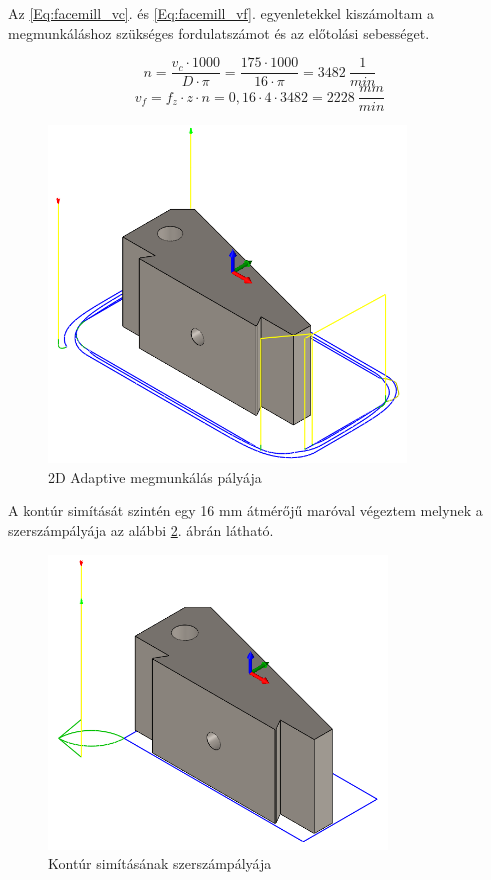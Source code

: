 \documentclass[12pt,a4paper,oneside]{report}
\begin{document}
Az \ref{Eq:facemill_vc}. és \ref{Eq:facemill_vf}. egyenletekkel kiszámoltam a megmunkáláshoz szükséges fordulatszámot és az előtolási sebességet. 

\begin{equation*}
    n=\dfrac{v_c\cdot1000}{D\cdot\pi}=\dfrac{175\cdot1000}{16\cdot\pi}=3482\ \dfrac{1}{min}
\end{equation*}
\begin{equation*}
    v_f=f_z\cdot z\cdot n=0,16\cdot4\cdot3482=2228\ \dfrac{mm}{min}
\end{equation*}

\begin{figure}[H]
    \centering
    \includegraphics[width=9.5cm]{figures/alaptest_adaptive_1.png}
    \caption{2D Adaptive megmunkálás pályája}
    \label{Fig:alaptest_adaptive_1}
\end{figure}

A kontúr simítását szintén egy 16 mm átmérőjű maróval végeztem melynek a szerszámpályája az alábbi \ref{Fig:alaptest_contour_1}. ábrán látható.

\begin{figure}[H]
    \centering
    \includegraphics[width=9cm]{figures/alaptest_contour_1.png}
    \caption{Kontúr simításának szerszámpályája}
    \label{Fig:alaptest_contour_1}
\end{figure}
\end{document}
